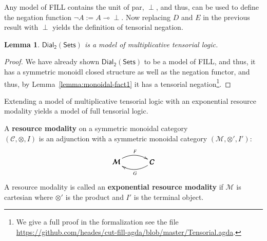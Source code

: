\documentclass{elsarticle}
\newcommand{\cat}[1]{\mathcal{#1}}
\newcommand{\limp}[0]{\multimap}
\newcommand{\dial}[0]{\mathsf{Dial_2}(\mathsf{Sets})}
\newtheorem{lemma}[theorem]{Lemma}
\begin{document}
Any model of FILL contains the unit of par, $\perp$, and thus, can be
used to define the negation function $\lnot A := A \limp \perp$.  Now
replacing $D$ and $E$ in the previous result with $\perp$ yields the
definition of tensorial negation.
\begin{lemma}
  \label{lemma:dial-tensorial}
  $\dial$ is a model of multiplicative tensorial logic.
\end{lemma}
\begin{proof}
  We have already shown $\dial$ to be a model of FILL, and thus, it has a
  symmetric monoidl closed structure as well as the negation functor, and thus, by
  Lemma~\ref{lemma:monoidal-fact1} it has a tensorial
  negation\footnote{We give a full proof in the formalization see the
    file
    \url{https://github.com/heades/cut-fill-agda/blob/master/Tensorial.agda}.}.
\end{proof}

Extending a model of multiplicative tensorial logic with an exponential
resource modality yields a model of full tensorial logic.
\begin{definition}
  \label{def:resource-modality}
  A \textbf{resource modality} on a symmetric monoidal category\\
  $(\cat{C}, \otimes, I)$ is an adjunction with a symmetric monoidal
  category $(\cat{M}, \otimes', I')$:
  \[
  \bfig
  \morphism(0,0)|a|/{@{>}@/^1em/}/<500,0>[\cat{M}`\cat{C};F]
  \morphism(0,0)|b|/{@{<-}@/_1em/}/<500,0>[\cat{M}`\cat{C};G]
  \efig
  \]
  A resource modality is called an \textbf{exponential resource
    modality} if $\cat{M}$ is cartesian where $\otimes'$ is the
  product and $I'$ is the terminal object.
\end{definition}
\end{document}

